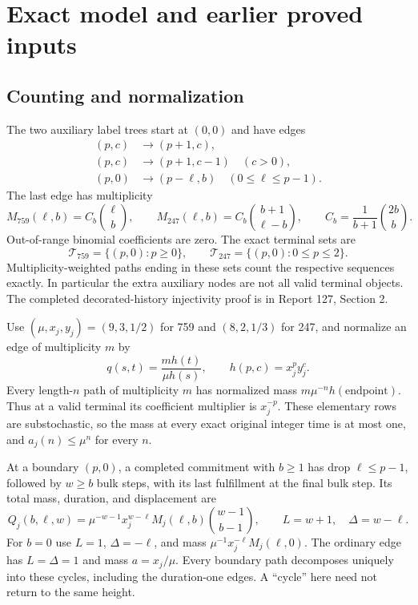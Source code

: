 \documentclass[11pt,letterpaper]{article}
\theoremstyle{remark}\newtheorem{remark}[theorem]{Remark}
\numberwithin{equation}{section}
\begin{document}
\section{Exact model and earlier proved inputs}\label{ivd:ll:sec:inputs}
\subsection{Counting and normalization}
The two auxiliary label trees start at $(0,0)$ and have edges
\begin{align*}
 (p,c)&\longrightarrow(p+1,c),\\
 (p,c)&\longrightarrow(p+1,c-1)\quad(c>0),\\
 (p,0)&\longrightarrow(p-\ell,b)\quad(0\le\ell\le p-1).
\end{align*}
The last edge has multiplicity
\[
 M_{759}(\ell,b)=C_b\binom\ell b,\qquad
 M_{247}(\ell,b)=C_b\binom{b+1}{\ell-b},\qquad
 C_b=\frac1{b+1}\binom{2b}b.
\]
Out-of-range binomial coefficients are zero. The exact terminal sets are
\[
 \mathcal T_{759}=\{(p,0):p\ge0\},\qquad
 \mathcal T_{247}=\{(p,0):0\le p\le2\}.
\]
Multiplicity-weighted paths ending in these sets count the respective
sequences exactly. In particular the extra auxiliary nodes are not
all valid terminal objects. The completed decorated-history
injectivity proof is in Report 127, Section 2.

Use $(\mu,x_j,y_j)=(9,3,1/2)$ for 759 and $(8,2,1/3)$ for 247,
and normalize an edge of multiplicity $m$ by
\[
 q(s,t)=\frac{m h(t)}{\mu h(s)},\qquad h(p,c)=x_j^p y_j^c.
\]
Every length-$n$ path of multiplicity $m$ has normalized mass
$m\mu^{-n}h(\text{endpoint})$. Thus at a valid terminal its
coefficient multiplier is $x_j^{-p}$. These elementary rows are
substochastic, so the mass at every exact original integer time is
at most one, and $a_j(n)\le\mu^n$ for every $n$.

At a boundary $(p,0)$, a completed commitment with $b\ge1$ has drop
$\ell\le p-1$, followed by $w\ge b$ bulk steps, with its last
fulfillment at the final bulk step. Its total mass, duration, and
displacement are
\begin{equation}\label{ivd:ll:eq:cycle}
 Q_j(b,\ell,w)=\mu^{-w-1}x_j^{w-\ell}M_j(\ell,b)
                     \binom{w-1}{b-1},\qquad
 L=w+1,\quad\Delta=w-\ell.
\end{equation}
For $b=0$ use $L=1$, $\Delta=-\ell$, and mass
$\mu^{-1}x_j^{-\ell}M_j(\ell,0)$. The ordinary edge has
$L=\Delta=1$ and mass $a=x_j/\mu$. Every boundary path decomposes
uniquely into these cycles, including the duration-one edges. A
``cycle'' here need not return to the same height.
\end{document}
